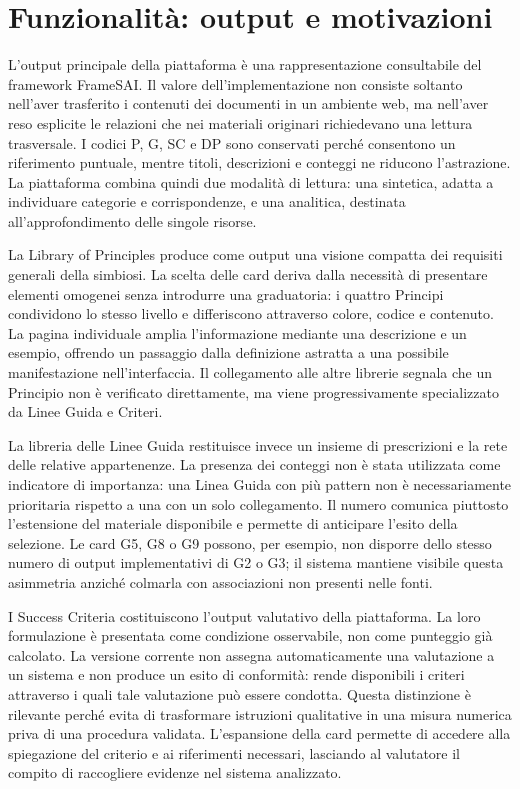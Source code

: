 \section{Funzionalità: output e motivazioni}

L'output principale della piattaforma è una rappresentazione consultabile del framework FrameSAI. Il valore dell'implementazione non consiste soltanto nell'aver trasferito i contenuti dei documenti in un ambiente web, ma nell'aver reso esplicite le relazioni che nei materiali originari richiedevano una lettura trasversale. I codici P, G, SC e DP sono conservati perché consentono un riferimento puntuale, mentre titoli, descrizioni e conteggi ne riducono l'astrazione. La piattaforma combina quindi due modalità di lettura: una sintetica, adatta a individuare categorie e corrispondenze, e una analitica, destinata all'approfondimento delle singole risorse.

La Library of Principles produce come output una visione compatta dei requisiti generali della simbiosi. La scelta delle card deriva dalla necessità di presentare elementi omogenei senza introdurre una graduatoria: i quattro Principi condividono lo stesso livello e differiscono attraverso colore, codice e contenuto. La pagina individuale amplia l'informazione mediante una descrizione e un esempio, offrendo un passaggio dalla definizione astratta a una possibile manifestazione nell'interfaccia. Il collegamento alle altre librerie segnala che un Principio non è verificato direttamente, ma viene progressivamente specializzato da Linee Guida e Criteri.

La libreria delle Linee Guida restituisce invece un insieme di prescrizioni e la rete delle relative appartenenze. La presenza dei conteggi non è stata utilizzata come indicatore di importanza: una Linea Guida con più pattern non è necessariamente prioritaria rispetto a una con un solo collegamento. Il numero comunica piuttosto l'estensione del materiale disponibile e permette di anticipare l'esito della selezione. Le card G5, G8 o G9 possono, per esempio, non disporre dello stesso numero di output implementativi di G2 o G3; il sistema mantiene visibile questa asimmetria anziché colmarla con associazioni non presenti nelle fonti.

I Success Criteria costituiscono l'output valutativo della piattaforma. La loro formulazione è presentata come condizione osservabile, non come punteggio già calcolato. La versione corrente non assegna automaticamente una valutazione a un sistema e non produce un esito di conformità: rende disponibili i criteri attraverso i quali tale valutazione può essere condotta. Questa distinzione è rilevante perché evita di trasformare istruzioni qualitative in una misura numerica priva di una procedura validata. L'espansione della card permette di accedere alla spiegazione del criterio e ai riferimenti necessari, lasciando al valutatore il compito di raccogliere evidenze nel sistema analizzato.

